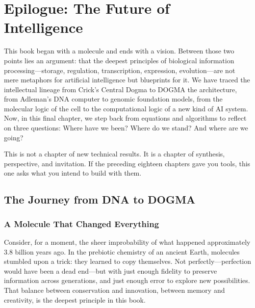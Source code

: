 
\chapter{Epilogue: The Future of Intelligence}
\label{ch:epilogue}


\noindent
This book began with a molecule and ends with a vision. Between those two points lies an argument: that the deepest principles of biological information processing---storage, regulation, transcription, expression, evolution---are not mere metaphors for artificial intelligence but blueprints for it. We have traced the intellectual lineage from Crick's Central Dogma to DOGMA the architecture, from Adleman's DNA computer to genomic foundation models, from the molecular logic of the cell to the computational logic of a new kind of AI system. Now, in this final chapter, we step back from equations and algorithms to reflect on three questions: Where have we been? Where do we stand? And where are we going?

This is not a chapter of new technical results. It is a chapter of synthesis, perspective, and invitation. If the preceding eighteen chapters gave you tools, this one asks what you intend to build with them.

\section{The Journey from DNA to DOGMA}
\label{sec:journey}

\subsection{A Molecule That Changed Everything}

Consider, for a moment, the sheer improbability of what happened approximately 3.8 billion years ago. In the prebiotic chemistry of an ancient Earth, molecules stumbled upon a trick: they learned to copy themselves. Not perfectly---perfection would have been a dead end---but with just enough fidelity to preserve information across generations, and just enough error to explore new possibilities. That balance between conservation and innovation, between memory and creativity, is the deepest principle in this book.

